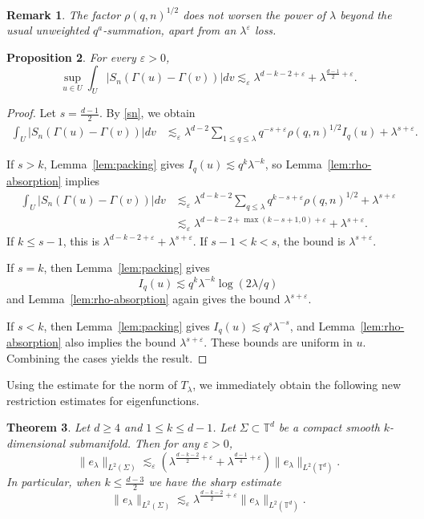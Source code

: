 \documentclass[11pt,reqno]{amsart}
\newtheorem{theorem}{Theorem}[section]
\newtheorem{proposition}[theorem]{Proposition}
\newtheorem{remark}[theorem]{Remark}
\numberwithin{equation}{section}
\newcommand{\1}{\textbf{1}}
\newcommand{\ls}{\lesssim}
\newcommand{\eps}{\varepsilon}
\newcommand{\la}{\lambda}
\begin{document}
	\begin{remark}
		The factor \(\rho(q,n)^{1/2}\) does not worsen the power of \(\la\) beyond the
		usual unweighted \(q^a\)-summation, apart from an \(\la^\eps\) loss.
	\end{remark}
	\begin{proposition}
		For every
		\(\eps>0\),	\[	\sup_{u\in U}\int_U|S_n(\Gamma(u)-\Gamma(v))|dv\ls_\eps	\la^{d-k-2+\eps}+\la^{\frac{d-1}2+\eps}. \]
	\end{proposition}
	\begin{proof}
		Let \(s=\frac{d-1}2\). By \eqref{sn}, we obtain
		\[
		\begin{aligned}
			\int_U|S_n(\Gamma(u)-\Gamma(v))|dv&\ls_\eps
			\la^{d-2}
			\sum_{1\le q\le\la}q^{-s+\eps}\rho(q,n)^{1/2}I_{q}(u)
			+\la^{s+\eps}.
		\end{aligned}
		\]
		
		
		If \(s>k\), Lemma~\ref{lem:packing} gives \(I_{q}(u)\ls q^k\la^{-k}\), so Lemma~\ref{lem:rho-absorption} implies 
		\begin{align*}
			\int_U|S_n(\Gamma(u)-\Gamma(v))|dv&\ls_\eps
			\la^{d-k-2}
			\sum_{q\le\la}q^{k-s+\eps}\rho(q,n)^{1/2}
			+\la^{s+\eps}\\
			&\ls_\eps
			\la^{d-k-2+\max(k-s+1,0)+\eps}+\la^{s+\eps}.
		\end{align*}
		If \(k\le s-1\), this is \(\la^{d-k-2+\eps}+\la^{s+\eps}\). If
		\(s-1<k<s\), the bound is  $\la^{s+\eps}$.
		
		If \(s=k\), then Lemma~\ref{lem:packing} gives
		$$I_{q}(u)\ls q^k\la^{-k}\log(2\la/q)$$ and Lemma~\ref{lem:rho-absorption}
		again gives the bound \(\la^{s+\eps}\). 
		
		If \(s<k\), then
		Lemma~\ref{lem:packing} gives \(I_{q}(u)\ls q^s\la^{-s}\), and Lemma~\ref{lem:rho-absorption}
		also implies the bound \(\la^{s+\eps}\).
		These bounds are uniform in $u$. Combining the cases yields the result.
	\end{proof}
	Using the estimate for the norm of $T_\la$, we immediately obtain the following new restriction estimates for eigenfunctions.
	\begin{theorem}\label{ntthm}
		Let \(d\ge4\) and $1\le k\le d-1$.  Let $\Sigma\subset \mathbb{T}^d$ be a compact smooth $k$-dimensional submanifold. Then for any
		\(\eps>0\),
		\[\|e_\la\|_{L^2(\Sigma)}\ls_\eps (\la^{\frac{d-k-2}2+\eps}+\la^{\frac{d-1}4+\eps})\|e_\la\|_{L^2(\mathbb{T}^d)}.\]
		In particular, when $k\le \frac{d-3}2$ we have the sharp estimate 
		\[\|e_\la\|_{L^2(\Sigma)}\ls_\eps \la^{\frac{d-k-2}2+\eps}\|e_\la\|_{L^2(\mathbb{T}^d)}.\]  
	\end{theorem}
\end{document}
